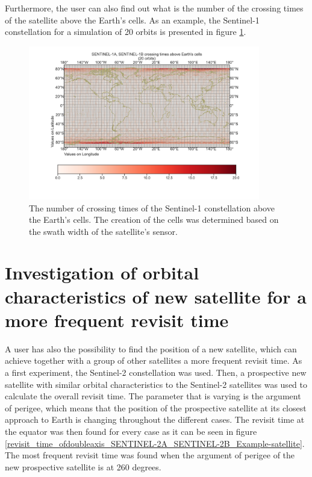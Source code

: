 Furthermore, the user can also find out what is the number of the crossing times of the satellite above the Earth's cells. As an example, the Sentinel-1 constellation for a simulation of 20 orbits is presented in figure \ref{SENTINEL-1A_SENTINEL-1B_crossing_times.png}.

\begin{figure}
\centering
\includegraphics[width=0.9\textwidth]{Images/SENTINEL-1A_SENTINEL-1B_crossing_times.png}
\caption{The number of crossing times of the Sentinel-1 constellation above the Earth's cells. The creation of the cells was determined based on the swath width of the satellite's sensor.}
\label{SENTINEL-1A_SENTINEL-1B_crossing_times.png}
\end{figure}

\bigskip
\section{Investigation of orbital characteristics of new satellite for a more frequent revisit time}
\bigskip

A user has also the possibility to find the position of a new satellite, which can achieve together with a group of other satellites a more frequent revisit time. As a first experiment, the Sentinel-2 constellation was used. Then, a prospective new satellite with similar orbital characteristics to the Sentinel-2 satellites was used to calculate the overall revisit time. The parameter that is varying is the argument of perigee, which means that the position of the prospective satellite at its closest approach to Earth is changing throughout the different cases. The revisit time at the equator was then found for every case as it can be seen in figure \ref{revisit_time_ofdoubleaxis_SENTINEL-2A_SENTINEL-2B_Example-satellite}. The most frequent revisit time was found when the argument of perigee of the new prospective satellite is at 260 degrees.

